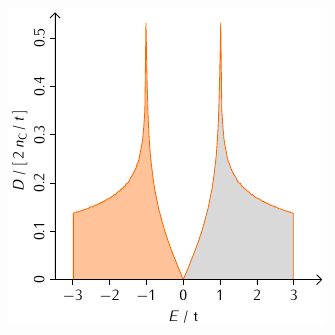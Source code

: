 \documentclass{beamer}
\begin{document}
\begin{frame}
\begin{minipage}{0.48\textwidth}
			\includegraphics[width=\textwidth]{Abbildungen/Bandstrukturen/DOS_C2_2.pdf}
		\end{minipage}
	\end{frame}
	
\end{document}
